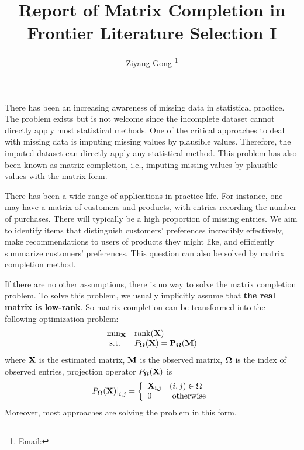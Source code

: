 \documentclass[a4paper,12pt,authoryear]{elegantpaper}
\title{Report of Matrix Completion in Frontier Literature Selection I}
\author{Ziyang Gong \thanks{Email: \email{meetziyang@outlook.com}}}
\institute{School of Statistics, Southwest University of Finance and Economics}
\date{}
\begin{document}
    \maketitle

    There has been an increasing awareness of missing data in statistical practice. The problem exists but is not welcome since the incomplete dataset cannot directly apply most statistical methods. One of the critical approaches to deal with missing data is imputing missing values by plausible values. Therefore, the imputed dataset can directly apply any statistical method. This problem has also been known as matrix completion, i.e., imputing missing values by plausible values with the matrix form.

    There has been a wide range of applications in practice life. For instance, one may have a matrix of customers and products, with entries recording the number of purchases. There will typically be a high proportion of missing entries. We aim to identify items that distinguish customers' preferences incredibly effectively, make recommendations to users of products they might like, and efficiently summarize customers' preferences. This question can also be solved by matrix completion method.

    If there are no other assumptions, there is no way to solve the matrix completion problem. To solve this problem, we usually implicitly assume that \textbf{the real matrix is low-rank}. So matrix completion can be transformed into the following optimization problem:
    \begin{equation}
        \label{equation:standard_matrix_completion}
        \begin{array}{ll}
        \min _{\bf X} & \operatorname{rank}(\bf X) \\
        \text { s.t. } & P_{\bf\Omega}(\bf X)=P_{\bf\Omega}(\bf M)
        \end{array}
    \end{equation}
    where $\bf X$ is the estimated matrix, $\bf M$ is the observed matrix, $\bf\Omega$ is the index of observed entries, projection operator $P_{\bf\Omega}(\bf X)$ is
    \begin{equation*}
        \left|P_{\bf\Omega}(\bf X)\right|_{i, j}=\left\{\begin{array}{ll}
            \bf{X}_{i, j} & (i, j) \in \Omega \\
            0 & \text { otherwise }
            \end{array}\right.
    \end{equation*}
    Moreover, most approaches are solving the problem in this form.
\end{document}

